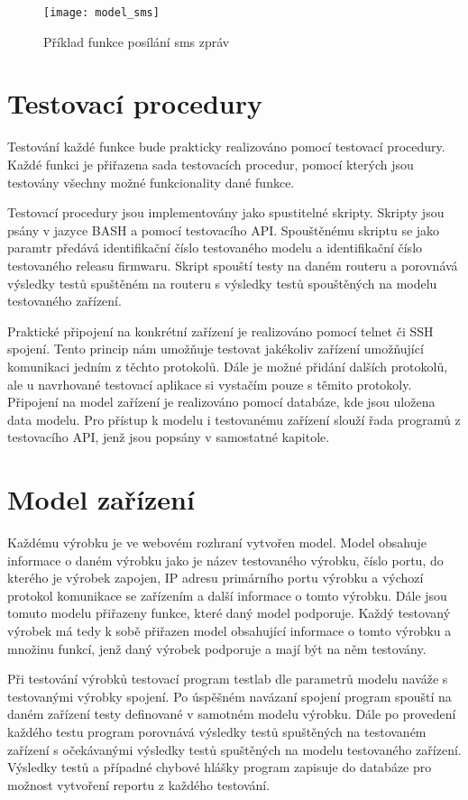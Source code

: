 \begin{figure}[h]
  \centering
  \texttt{[image: model\_sms]}
  \caption{Příklad funkce posílání sms zpráv}
  \label{fig:model_sms}
\end{figure}

\section{Testovací procedury}
Testování každé funkce bude prakticky realizováno pomocí testovací procedury. Každé funkci je přiřazena sada testovacích procedur, pomocí kterých jsou testovány všechny možné funkcionality dané funkce.

Testovací procedury jsou implementovány jako spustitelné skripty. Skripty jsou psány v jazyce BASH a pomocí testovacího API. Spouštěnému skriptu se jako paramtr předává identifikační číslo testovaného modelu a identifikační číslo testovaného releasu firmwaru. Skript spouští testy na daném routeru a porovnává výsledky testů spuštěném na routeru s výsledky testů spouštěných na modelu testovaného zařízení.

Praktické připojení na konkrétní zařízení je realizováno pomocí telnet či SSH spojení. Tento princip nám umožňuje testovat jakékoliv zařízení umožňující komunikaci jedním z těchto protokolů. Dále je možné přidání dalších protokolů, ale u navrhované testovací aplikace si vystačím pouze s těmito protokoly. Připojení na model zařízení je realizováno pomocí databáze, kde jsou uložena data modelu. Pro přístup k modelu i testovanému zařízení slouží řada programů z testovacího API, jenž jsou popsány v samostatné kapitole.

\section{Model zařízení}
Každému výrobku je ve webovém rozhraní vytvořen model. Model obsahuje informace o daném výrobku jako je název testovaného výrobku, číslo portu, do kterého je výrobek zapojen, IP adresu primárního portu výrobku a výchozí protokol komunikace se zařízením a další informace o tomto výrobku. Dále jsou tomuto modelu přiřazeny funkce, které daný model podporuje. Každý testovaný výrobek má tedy k sobě přiřazen model obsahující informace o tomto výrobku a množinu funkcí, jenž daný výrobek podporuje a mají být na něm testovány.

Při testování výrobků testovací program testlab dle parametrů modelu naváže s testovanými výrobky spojení. Po úspěšném navázaní spojení program spouští na daném zařízení testy definované v samotném modelu výrobku. Dále po provedení každého testu program porovnává výsledky testů spuštěných na testovaném zařízení s očekávanými výsledky testů spuštěných na modelu testovaného zařízení. Výsledky testů a případné chybové hlášky program zapisuje do databáze pro možnost vytvoření reportu z každého testování.

